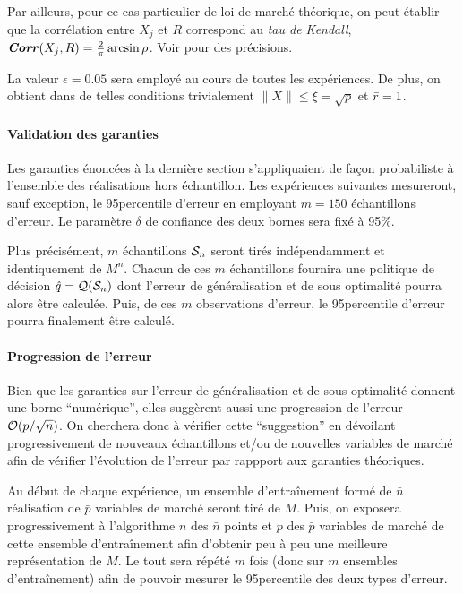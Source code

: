Par ailleurs, pour ce cas particulier de loi de marché théorique, on peut établir que la
corrélation entre $X_j$ et $R$ correspond au \textit{tau de Kendall}, \ie\ $\Corr(X_j,R) =
\tfrac{2}{\pi}\arcsin\rho$. Voir \cite{remillard2013statistical} pour des précisions.

La valeur $\epsilon = 0.05$ sera employé au cours de toutes les expériences. De plus, on obtient
dans de telles conditions trivialement $\|X\| \leq \xi = \sqrt{p}$ et $\rmax = 1$.


\paragraph{Validation des garanties}

Les garanties énoncées à la dernière section s'appliquaient de façon probabiliste à
l'ensemble des réalisations hors échantillon. Les expériences suivantes mesureront, sauf
exception, le 95\ieme percentile d'erreur en employant $m=150$ échantillons d'erreur. Le
paramètre $\delta$ de confiance des deux bornes sera fixé à 95\%.

Plus précisément, $m$ échantillons $\S_n$ seront tirés indépendamment et identiquement de
$M^n$. Chacun de ces $m$ échantillons fournira une politique de décision
$\qh = \alg(\S_n)$ dont l'erreur de généralisation et de sous optimalité pourra alors être
calculée. Puis, de ces $m$ observations d'erreur, le 95\ieme percentile d'erreur pourra
finalement être calculé.

\paragraph{Progression de l'erreur}

Bien que les garanties sur l'erreur de généralisation et de sous optimalité donnent une
borne ``numérique'', elles suggèrent aussi une progression de l'erreur
$\bigO(p/\sqrt{n})$. On cherchera donc à vérifier cette ``suggestion'' en dévoilant
progressivement de nouveaux échantillons et/ou de nouvelles variables de marché afin de
vérifier l'évolution de l'erreur par rappport aux garanties théoriques.

Au début de chaque expérience, un ensemble d'entraînement formé de $\bar n$ réalisation de
$\bar p$ variables de marché seront tiré de $M$. Puis, on exposera progressivement à
l'algorithme $n$ des $\bar n$ points et $p$ des $\bar p$ variables de marché de cette
ensemble d'entraînement afin d'obtenir peu à peu une meilleure représentation de $M$. Le
tout sera répété $m$ fois (donc sur $m$ ensembles d'entraînement) afin de pouvoir mesurer
le 95\ieme percentile des deux types d'erreur.

